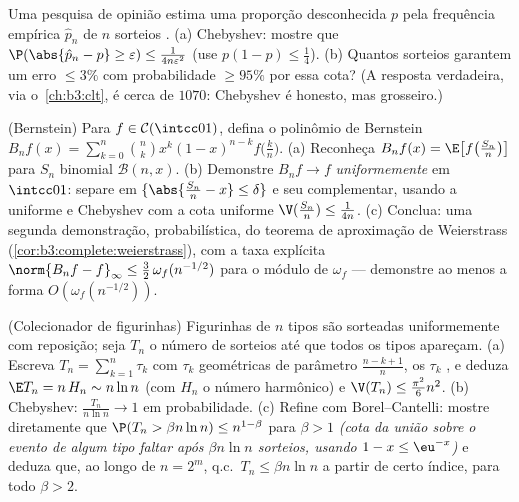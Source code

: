 \begin{exercise}[$\star\star$]\label{exo:b3:probability:7}
Uma pesquisa de opinião estima uma proporção desconhecida $p$ pela
frequência empírica $\hat p_n$ de $n$ sorteios .
(a) Chebyshev: mostre que $\P(\abs{\hat p_n - p} \geq \varepsilon)
\leq \frac1{4n\varepsilon^2}$ (use $p(1-p) \leq \frac14$).
(b) Quantos sorteios garantem um erro $\leq 3\%$ com probabilidade $\geq 95\%$ por
essa cota? (A resposta verdadeira, via o~\cref{ch:b3:clt}, é cerca de
$1070$: Chebyshev é honesto, mas grosseiro.)
\end{exercise}

\begin{exercise}[$\star\star\star$]\label{exo:b3:probability:8}
(Bernstein) Para $f \in \mathcal C(\intcc01)$, defina o polinômio de Bernstein $B_nf(x) =
\sum_{k=0}^n\binom nkx^k(1-x)^{n-k}f\bigl(\frac kn\bigr)$.
(a) Reconheça $B_nf(x) = \E\bigl[f\bigl(\frac
{S_n}n\bigr)\bigr]$ para $S_n$ binomial $\mathcal B(n, x)$.
(b) Demonstre $B_nf \to f$ \emph{uniformemente} em $\intcc01$: separe em $\{\abs{\frac{S_n}n - x} \leq \delta\}$ e seu
complementar, usando a  uniforme e Chebyshev com a cota
uniforme $\V(\frac{S_n}n) \leq \frac1{4n}$.
(c) Conclua: uma segunda demonstração, probabilística, do teorema de
aproximação de Weierstrass (\cref{cor:b3:complete:weierstrass}), com a taxa explícita $\norm{B_nf - f}_\infty \leq \frac32\,\omega_f(n^{-1/2})$
para o módulo de  $\omega_f$ --- demonstre ao menos a forma
$O(\omega_f(n^{-1/2}))$.
\end{exercise}

\begin{exercise}[$\star\star\star$]\label{exo:b3:probability:9}
(Colecionador de figurinhas) Figurinhas de $n$ tipos são sorteadas
uniformemente com reposição; seja $T_n$ o número de sorteios até que
todos os tipos apareçam.
(a) Escreva $T_n = \sum_{k=1}^{n}\tau_k$ com $\tau_k$ geométricas de parâmetro $\frac{n - k + 1}n$, os
$\tau_k$ , e deduza $\E T_n = n\,H_n \sim n\ln n$ (com $H_n$ o número
harmônico) e $\V(T_n) \leq
\frac{\pi^2}6n^2$.
(b) Chebyshev: $\frac{T_n}{n\ln n} \to 1$ em probabilidade.
(c) Refine com Borel--Cantelli: mostre diretamente que $\P(T_n >
\beta n\ln n) \leq n^{1 - \beta}$ para $\beta > 1$
\emph{(cota da união sobre o evento de algum tipo faltar após $\beta n\ln n$
sorteios, usando $1 - x \leq \eu^{-x}$)} e deduza que, ao longo de $n = 2^m$, q.c.\ $T_n \leq \beta n\ln
n$ a
partir de certo índice, para todo $\beta > 2$.
\end{exercise}

